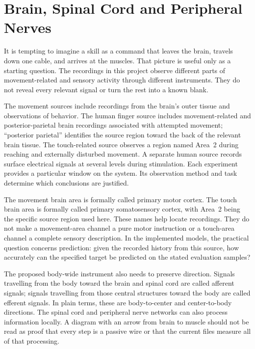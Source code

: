 \section{Brain, Spinal Cord and Peripheral Nerves}

It is tempting to imagine a skill as a command that leaves the brain, travels down one cable, and arrives at the muscles. That picture is useful only as a starting question. The recordings in this project observe different parts of movement-related and sensory activity through different instruments. They do not reveal every relevant signal or turn the rest into a known blank.

The movement sources include recordings from the brain's outer tissue and observations of behavior. The human finger source includes movement-related and posterior-parietal brain recordings associated with attempted movement; ``posterior parietal'' identifies the source region toward the back of the relevant brain tissue. The touch-related source observes a region named Area~2 during reaching and externally disturbed movement. A separate human source records surface electrical signals at several levels during stimulation. Each experiment provides a particular window on the system. Its observation method and task determine which conclusions are justified.\cite{odoherty2020,human_fingers2023,chowdhury2020,spinal_dataset2023}

The movement brain area is formally called primary motor cortex. The touch brain area is formally called primary somatosensory cortex, with Area~2 being the specific source region used here. These names help locate recordings. They do not make a movement-area channel a pure motor instruction or a touch-area channel a complete sensory description. In the implemented models, the practical question concerns prediction: given the recorded history from this source, how accurately can the specified target be predicted on the stated evaluation samples?

The proposed body-wide instrument also needs to preserve direction. Signals travelling from the body toward the brain and spinal cord are called afferent signals; signals travelling from those central structures toward the body are called efferent signals. In plain terms, these are body-to-center and center-to-body directions. The spinal cord and peripheral nerve networks can also process information locally. A diagram with an arrow from brain to muscle should not be read as proof that every step is a passive wire or that the current files measure all of that processing.

